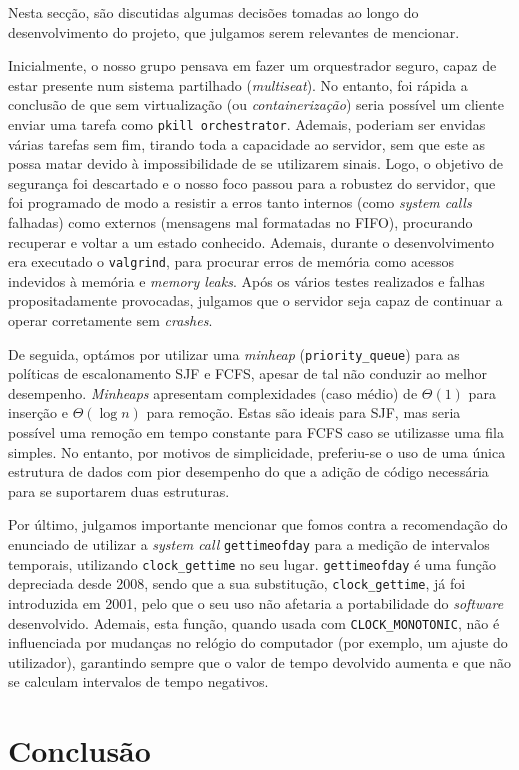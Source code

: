 \documentclass[11pt]{article}
\begin{document}
Nesta secção, são discutidas algumas decisões tomadas ao longo do desenvolvimento do projeto, que
julgamos serem relevantes de mencionar.

Inicialmente, o nosso grupo pensava em fazer um orquestrador seguro, capaz de estar presente num
sistema partilhado (\emph{multiseat}). No entanto, foi rápida a conclusão de que sem virtualização
(ou \emph{containerização}) seria possível um cliente enviar uma tarefa como \texttt{pkill
orchestrator}. Ademais, poderiam ser envidas várias tarefas sem fim, tirando toda a capacidade ao
servidor, sem que este as possa matar devido à impossibilidade de se utilizarem sinais. Logo, o
objetivo de segurança foi descartado e o nosso foco passou para a robustez do servidor, que foi
programado de modo a resistir a erros tanto internos (como \emph{system calls} falhadas) como
externos (mensagens mal formatadas no FIFO), procurando recuperar e voltar a um estado conhecido.
Ademais, durante o desenvolvimento era executado o \texttt{valgrind}, para procurar erros de memória
como acessos indevidos à memória e \emph{memory leaks}. Após os vários testes realizados e falhas
propositadamente provocadas, julgamos que o servidor seja capaz de continuar a operar corretamente
sem \emph{crashes}.

De seguida, optámos por utilizar uma \emph{minheap} (\texttt{priority\_queue}) para as políticas de
escalonamento SJF e FCFS, apesar de tal não conduzir ao melhor desempenho. \emph{Minheaps}
apresentam complexidades (caso médio) de $\Theta(1)$ para inserção e $\Theta(\log n)$ para remoção.
Estas são ideais para SJF, mas seria possível uma remoção em tempo constante para FCFS caso se
utilizasse uma fila simples. No entanto, por motivos de simplicidade, preferiu-se o uso de uma única
estrutura de dados com pior desempenho do que a adição de código necessária para se suportarem duas
estruturas.

Por último, julgamos importante mencionar que fomos contra a recomendação do enunciado de utilizar a
\emph{system call} \texttt{gettimeofday} para a medição de intervalos temporais, utilizando
\texttt{clock\_gettime} no seu lugar. \texttt{gettimeofday} é uma função depreciada desde 2008,
sendo que a sua substitução, \texttt{clock\_gettime}, já foi introduzida em 2001, pelo que o seu uso
não afetaria a portabilidade do \emph{software} desenvolvido. Ademais, esta função, quando usada com
\texttt{CLOCK\_MONOTONIC}, não é influenciada por mudanças no relógio do computador (por exemplo,
um ajuste do utilizador), garantindo sempre que o valor de tempo devolvido aumenta e que não se
calculam intervalos de tempo negativos.

\section{Conclusão}



\end{document}
